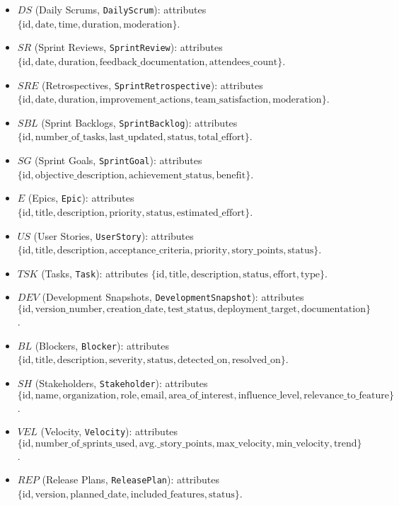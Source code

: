 \documentclass[11pt,a4paper]{article}
\begin{document}
\begin{itemize}
  \item $DS$ (Daily Scrums, \texttt{DailyScrum}): attributes $\{\text{id},\text{date},\text{time},\text{duration},\text{moderation}\}$.
  \item $SR$ (Sprint Reviews, \texttt{SprintReview}): attributes $\{\text{id},\text{date},\text{duration},\text{feedback\_documentation},\text{attendees\_count}\}$.
  \item $SRE$ (Retrospectives, \texttt{SprintRetrospective}): attributes $\{\text{id},\text{date},\text{duration},\text{improvement\_actions},\text{team\_satisfaction},\text{moderation}\}$.
  \item $SBL$ (Sprint Backlogs, \texttt{SprintBacklog}): attributes $\{\text{id},\text{number\_of\_tasks},\text{last\_updated},\text{status},\text{total\_effort}\}$.
  \item $SG$ (Sprint Goals, \texttt{SprintGoal}): attributes $\{\text{id},\text{objective\_description},\text{achievement\_status},\text{benefit}\}$.
  \item $E$ (Epics, \texttt{Epic}): attributes $\{\text{id},\text{title},\text{description},\text{priority},\text{status},\text{estimated\_effort}\}$.
  \item $US$ (User Stories, \texttt{UserStory}): attributes $\{\text{id},\text{title},\text{description},\text{acceptance\_criteria},\text{priority},\text{story\_points},\text{status}\}$.
  \item $TSK$ (Tasks, \texttt{Task}): attributes $\{\text{id},\text{title},\text{description},\text{status},\text{effort},\text{type}\}$.
  \item $DEV$ (Development Snapshots, \texttt{DevelopmentSnapshot}): attributes $\{\text{id},\text{version\_number},\text{creation\_date},\text{test\_status},\text{deployment\_target},\text{documentation}\}$.
  \item $BL$ (Blockers, \texttt{Blocker}): attributes $\{\text{id},\text{title},\text{description},\text{severity},\text{status},\text{detected\_on},\text{resolved\_on}\}$.
  \item $SH$ (Stakeholders, \texttt{Stakeholder}): attributes $\{\text{id},\text{name},\text{organization},\text{role},\text{email},\text{area\_of\_interest},\text{influence\_level},\text{relevance\_to\_feature}\}$.
  \item $VEL$ (Velocity, \texttt{Velocity}): attributes $\{\text{id},\text{number\_of\_sprints\_used},\text{avg.\_story\_points},\text{max\_velocity},\text{min\_velocity},\text{trend}\}$.
  \item $REP$ (Release Plans, \texttt{ReleasePlan}): attributes $\{\text{id},\text{version},\text{planned\_date},\text{included\_features},\text{status}\}$.

\end{itemize}
\end{document}
